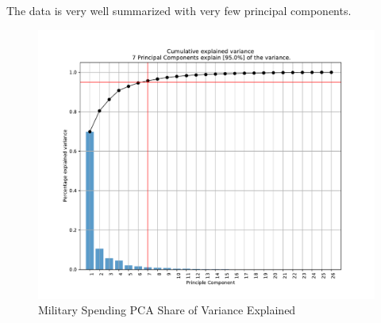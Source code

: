 \documentclass{report}
\begin{document}
    The data is very well summarized with very few principal components.

	\begin{figure}[h!]
		\centering
		\caption{Military Spending PCA Share of Variance Explained}
		\label{Milex_PC_Share_Explained}	
		\includegraphics[width=\linewidth,keepaspectratio=true]{../Output/Figures/Milex_PC_Share_Explained.pdf}
	\end{figure}
\end{document}
